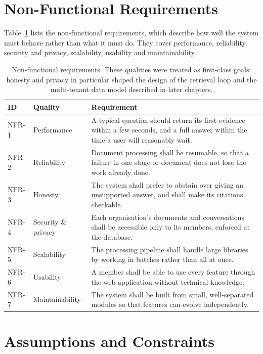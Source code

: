 \section{Non-Functional Requirements}

Table~\ref{tab:nfr} lists the non-functional requirements, which describe how
well the system must behave rather than what it must do. They cover performance,
reliability, security and privacy, scalability, usability and maintainability.

\begin{table}[H]
  \centering
  \caption{Non-functional requirements. These qualities were treated as
  first-class goals: honesty and privacy in particular shaped the design of the
  retrieval loop and the multi-tenant data model described in later chapters.}
  \label{tab:nfr}
  \small
  \begin{tabularx}{\textwidth}{@{}p{}p{}X@{}}
    \toprule
    \textbf{ID} & \textbf{Quality} & \textbf{Requirement} \\
    \midrule
    NFR-1 & Performance     & A typical question should return its first evidence within a few seconds, and a full answer within the time a user will reasonably wait. \\
    NFR-2 & Reliability     & Document processing shall be resumable, so that a failure in one stage or document does not lose the work already done. \\
    NFR-3 & Honesty         & The system shall prefer to abstain over giving an unsupported answer, and shall make its citations checkable. \\
    NFR-4 & Security \& privacy & Each organisation's documents and conversations shall be accessible only to its members, enforced at the database. \\
    NFR-5 & Scalability     & The processing pipeline shall handle large libraries by working in batches rather than all at once. \\
    NFR-6 & Usability       & A member shall be able to use every feature through the web application without technical knowledge. \\
    NFR-7 & Maintainability & The system shall be built from small, well-separated modules so that features can evolve independently. \\
  \end{tabularx}
\end{table}

\section{Assumptions and Constraints}

